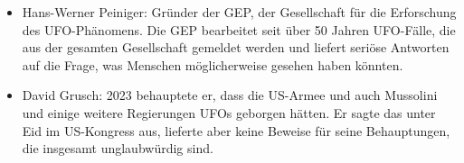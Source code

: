 \documentclass{scrartcl}
\begin{document}
\begin{itemize}
	\item Hans-Werner Peiniger: Gründer der GEP, der Gesellschaft für die Erforschung des UFO-Phänomens. Die GEP bearbeitet seit über 50 Jahren UFO-Fälle, die aus der gesamten Gesellschaft gemeldet werden und liefert seriöse Antworten auf die Frage, was Menschen möglicherweise gesehen haben könnten.


	\item David Grusch: 2023 behauptete er, dass die US-Armee und auch Mussolini und einige weitere Regierungen UFOs geborgen hätten. Er sagte das unter Eid im US-Kongress aus, lieferte aber keine Beweise für seine Behauptungen, die insgesamt unglaubwürdig sind.
\end{itemize}
\end{document}
